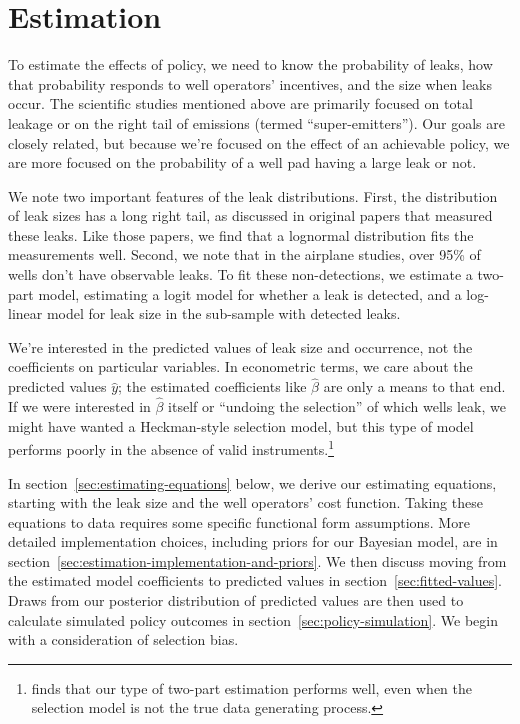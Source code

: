 \section{Estimation}
\label{sec:estimation}

To estimate the effects of policy, we need to know the probability of leaks, how that probability responds to well operators' incentives, and the size when leaks occur.
The scientific studies mentioned above are primarily focused on total leakage or on the  right tail of emissions (termed ``super-emitters'').
Our goals are closely related, but because we're focused on the effect of an achievable policy, we are more focused on the probability of a well pad having a large leak or not.


We note two important features of the leak distributions.
First, the distribution of leak sizes has a long right tail,
as discussed in original papers that measured these leaks.
Like those papers, we find that a lognormal distribution fits the measurements well.
Second, we note that in the airplane studies, over 95\% of wells don't have observable leaks.
To fit these non-detections, we estimate a two-part model, estimating a logit model for whether a leak is detected, and a log-linear model for leak size in the sub-sample with detected leaks.

We're interested in the predicted values of leak size and occurrence, not the coefficients on particular variables.
In econometric terms, we care about the predicted values \(\hat{y}\); the estimated coefficients like \(\hat{\beta}\) are only a means to that end.
If we were interested in \(\hat{\beta}\) itself or ``undoing the selection'' of which wells leak, we might have wanted a Heckman-style selection model, but this type of model performs poorly in the absence of valid instruments.\footnote{%
\textcite{Manning/Duan/Rogers:1987} finds that our type of two-part estimation performs well, even when the selection model is not the true data generating process.
}


In section~\ref{sec:estimating-equations} below, we derive our estimating equations, starting with the leak size and the well operators' cost function.
Taking these equations to data requires some specific functional form assumptions.
More detailed implementation choices, including priors for our Bayesian model, are in section~\ref{sec:estimation-implementation-and-priors}.
We then discuss moving from the estimated model coefficients to predicted values in section~\ref{sec:fitted-values}.
Draws from our posterior distribution of predicted values are then used to calculate simulated policy outcomes in section~\ref{sec:policy-simulation}.
We begin with a consideration of selection bias.



